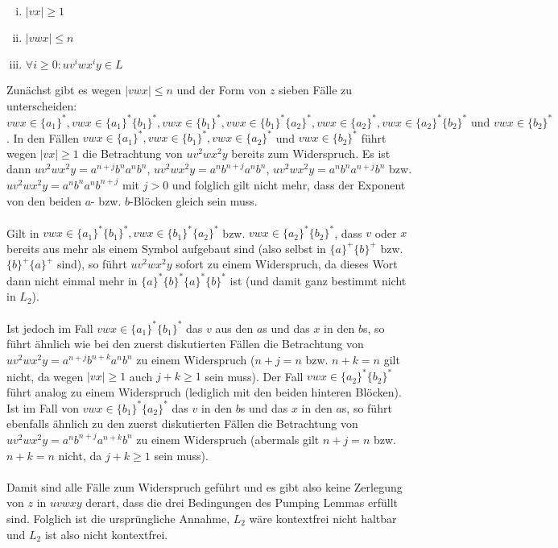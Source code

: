 \documentclass[10pt,a4paper,oneside,ngerman,numbers=noenddot]{scrartcl}
\begin{document}
\begin{enumerate}[i)]
	\item $|vx| \geq 1$
	\item $|vwx| \leq n$
	\item $\forall i \geq 0:uv^{i}wx^{i}y \in L$
\end{enumerate}
Zunächst gibt es wegen $|vwx| \leq n$ und der Form von $z$ sieben Fälle zu unterscheiden: $vwx \in \{a_{1}\}^{*}, vwx \in \{a_{1}\}^{*}\{b_{1}\}^{*}, vwx \in \{b_{1}\}^{*}, vwx \in \{b_{1}\}^{*}\{a_{2}\}^{*}, vwx \in \{a_{2}\}^{*}, vwx \in \{a_{2}\}^{*}\{b_{2}\}^{*} \text{ und } vwx \in \{b_{2}\}^{*}$. In den Fällen $vwx \in \{a_{1}\}^{*}, vwx \in \{b_{1}\}^{*}, vwx \in \{a_{2}\}^{*}$ und $vwx \in \{b_{2}\}^{*}$ führt wegen $|vx| \geq 1$ die Betrachtung von $uv^{2}wx^{2}y$ bereits zum Widerspruch. Es ist dann $uv^{2}wx^{2}y = a^{n+j}b^{n}a^{n}b^{n}$, $uv^{2}wx^{2}y = a^{n}b^{n+j}a^{n}b^{n}$, $uv^{2}wx^{2}y = a^{n}b^{n}a^{n+j}b^{n}$ bzw. $uv^{2}wx^{2}y = a^{n}b^{n}a^{n}b^{n+j}$ mit $j > 0$ und folglich gilt nicht mehr, dass der Exponent von den beiden $a$- bzw. $b$-Blöcken gleich sein muss.\\
\\
Gilt in $vwx \in \{a_{1}\}^{*}\{b_{1}\}^{*}, vwx \in \{b_{1}\}^{*}\{a_{2}\}^{*}$ bzw. $vwx \in \{a_{2}\}^{*}\{b_{2}\}^{*}$, dass $v$ oder $x$ bereits aus mehr als einem Symbol aufgebaut sind (also selbst in $\{a\}^{+}\{b\}^{+}$ bzw. $\{b\}^{+}\{a\}^{+}$ sind), so führt $uv^{2}wx^{2}y$ sofort zu einem Widerspruch, da dieses Wort dann nicht einmal mehr in $\{a\}^{*}\{b\}^{*}\{a\}^{*}\{b\}^{*}$ ist (und damit ganz bestimmt nicht in $L_{2}$).\\
\\
Ist jedoch im Fall $vwx \in \{a_{1}\}^{*}\{b_{1}\}^{*}$ das $v$ aus den $a$s und das $x$ in den $b$s, so führt ähnlich wie bei den zuerst diskutierten Fällen die Betrachtung von $uv^{2}wx^{2}y = a^{n+j}b^{n+k}a^{n}b^{n}$ zu einem Widerspruch ($n+j = n$ bzw. $n+k = n$ gilt nicht, da wegen $|vx| \geq 1$ auch $j+k \geq 1$ sein muss). Der Fall $vwx \in \{a_{2}\}^{*}\{b_{2}\}^{*}$ führt analog zu einem Widerspruch (lediglich mit den beiden hinteren Blöcken).\\
Ist im Fall von $vwx \in \{b_{1}\}^{*}\{a_{2}\}^{*}$ das $v$ in den $b$s und das $x$ in den $a$s, so führt ebenfalls ähnlich zu den zuerst diskutierten Fällen die Betrachtung von $uv^{2}wx^{2}y = a^{n}b^{n+j}a^{n+k}b^{n}$ zu einem Widerspruch (abermals gilt $n+j = n$ bzw. $n+k = n$ nicht, da $j+k \geq 1$ sein muss).\\
\\
Damit sind alle Fälle zum Widerspruch geführt und es gibt also keine Zerlegung von $z$ in $uvwxy$ derart, dass die drei Bedingungen des Pumping Lemmas erfüllt sind. Folglich ist die ursprüngliche Annahme, $L_{2}$ wäre kontextfrei nicht haltbar und $L_{2}$ ist also nicht kontextfrei.
\end{document}
